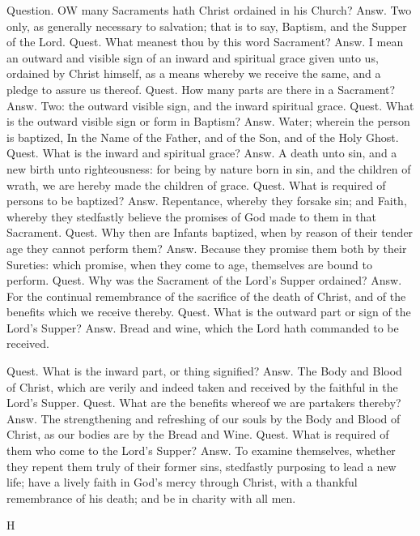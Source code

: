 Question. OW many Sacraments hath Christ ordained in his Church? Answ. Two only, as generally necessary to salvation; that is to say, Baptism, and the Supper of the Lord. Quest. What meanest thou by this word Sacrament? Answ. I mean an outward and visible sign of an inward and spiritual grace given unto us, ordained by Christ himself, as a means whereby we receive the same, and a pledge to assure us thereof. Quest. How many parts are there in a Sacrament? Answ. Two: the outward visible sign, and the inward spiritual grace. Quest. What is the outward visible sign or form in Baptism? Answ. Water; wherein the person is baptized, In the Name of the Father, and of the Son, and of the Holy Ghost. Quest. What is the inward and spiritual grace? Answ. A death unto sin, and a new birth unto righteousness: for being by nature born in sin, and the children of wrath, we are hereby made the children of grace. Quest. What is required of persons to be baptized? Answ. Repentance, whereby they forsake sin; and Faith, whereby they stedfastly believe the promises of God made to them in that Sacrament. Quest. Why then are Infants baptized, when by reason of their tender age they cannot perform them? Answ. Because they promise them both by their Sureties: which promise, when they come to age, themselves are bound to perform. Quest. Why was the Sacrament of the Lord’s Supper ordained? Answ. For the continual remembrance of the sacrifice of the death of Christ, and of the benefits which we receive thereby. Quest. What is the outward part or sign of the Lord's Supper? Answ. Bread and wine, which the Lord hath commanded to be received.

Quest. What is the inward part, or thing signified? Answ. The Body and Blood of Christ, which are verily and indeed taken and received by the faithful in the Lord’s Supper. Quest. What are the benefits whereof we are partakers thereby? Answ. The strengthening and refreshing of our souls by the Body and Blood of Christ, as our bodies are by the Bread and Wine. Quest. What is required of them who come to the Lord’s Supper? Answ. To examine themselves, whether they repent them truly of their former sins, stedfastly purposing to lead a new life; have a lively faith in God’s mercy through Christ, with a thankful remembrance of his death; and be in charity with all men.

H

